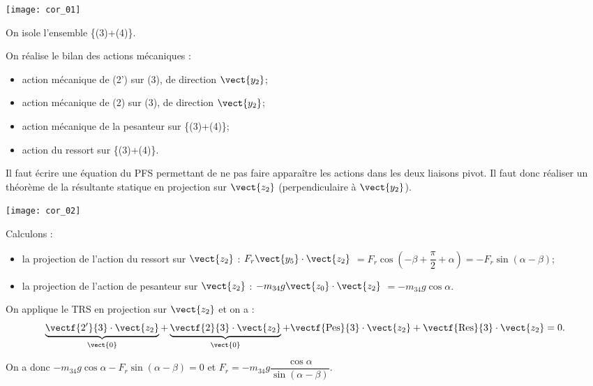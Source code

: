 \begin{corrige}
\begin{center}
\texttt{[image: cor\_01]}
\end{center}

On isole l'ensemble \{(3)+(4)\}. 

On réalise le bilan des actions mécaniques : 
\begin{itemize}
\item action mécanique de (2') sur (3), de direction $\vect{y_2}$;
\item action mécanique de (2) sur (3), de direction $\vect{y_2}$;
\item action mécanique de la pesanteur sur \{(3)+(4)\};
\item action du ressort sur \{(3)+(4)\}.
\end{itemize}

Il faut écrire une équation du PFS permettant de ne pas faire apparaître les actions dans les deux liaisons pivot. Il faut donc réaliser un théorème de la résultante statique en projection sur $\vect{z_2}$ (perpendiculaire à $\vect{y_2}$).

\end{corrige}
\else
\fi

\ifprof
\begin{marginfigure}
\texttt{[image: cor\_02]}
\end{marginfigure}

\begin{corrige}
Calculons : 
\begin{itemize}
\item la projection de l'action du ressort sur $\vect{z_2}$ : $F_r \vect{y_5} \cdot\vect{z_2}$ $=F_r\cos\left(-\beta +\dfrac{\pi}{2}+\alpha\right)=-F_r\sin\left(\alpha-\beta \right)$;
\item la projection de l'action de pesanteur sur $\vect{z_2}$ : $-m_{34} g \vect{z_0} \cdot\vect{z_2}$ $=-m_{34} g\cos\alpha$.
\end{itemize}
On applique le TRS en projection sur $\vect{z_2}$ et on a  :
$$
\underbrace{\vectf{2'}{3}\cdot \vect{z_2}}_{\vect{0}}+\underbrace{\vectf{2}{3}\cdot \vect{z_2}}_{\vect{0}}+\vectf{\text{Pes}}{3}\cdot \vect{z_2}+\vectf{\text{Res}}{3}\cdot \vect{z_2}=0.
$$

On a donc $-m_{34} g\cos\alpha -F_r\sin\left(\alpha-\beta \right) = 0$ et  
$\boxed{F_r = -m_{34} g \dfrac{\cos\alpha}{\sin\left(\alpha-\beta \right)}}$.



\end{corrige}
\else
\fi


